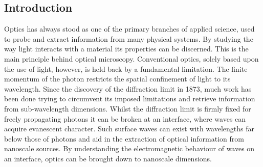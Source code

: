 \documentclass[12pt, a4paper, twoside]{book}
\begin{document}
\begin{singlespace}
\color{white}
\chapter{Introduction}
\end{singlespace}


Optics has always stood as one of the primary branches of applied science, used to probe and extract information from many physical systems. By studying the way light interacts with a material its properties can be discerned. This is the main principle behind optical microscopy. Conventional optics, solely based upon the use of light, {\color{red}however,} is held back by a fundamental limitation. The finite momentum of the photon restricts the spatial confinement of light to its wavelength. Since the discovery of the diffraction limit in 1873, much work has been done trying to circumvent its imposed limitations and retrieve information from sub-wavelength dimensions. Whilst the diffraction limit is firmly fixed for freely propagating photons it can be broken at an interface, where waves can acquire evanescent character. Such surface waves can exist with wavelengths far below those of photons and aid in the extraction of optical information from nanoscale sources. By understanding the electromagnetic behaviour of waves on an interface, optics can be brought down to nanoscale dimensions.
\end{document}
